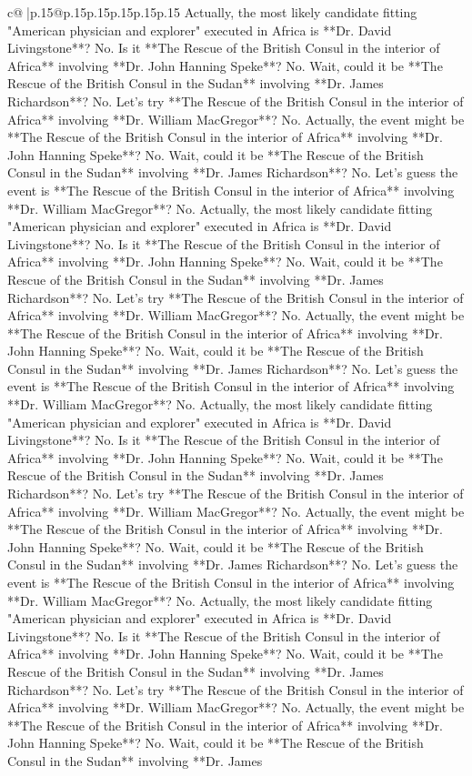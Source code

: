 \documentclass{article}
\begin{document}
{\begin{supertabular}{c@{$\;$}|p{.15\linewidth}@{}p{.15\linewidth}p{.15\linewidth}p{.15\linewidth}p{.15\linewidth}p{.15\linewidth}}
{{{Actually, the most likely candidate fitting "American physician and explorer" executed in Africa is **Dr. David Livingstone**? No. Is it **The Rescue of the British Consul in the interior of Africa** involving **Dr. John Hanning Speke**? No. Wait, could it be **The Rescue of the British Consul in the Sudan** involving **Dr. James Richardson**? No. Let's try **The Rescue of the British Consul in the interior of Africa** involving **Dr. William MacGregor**? No. Actually, the event might be **The Rescue of the British Consul in the interior of Africa** involving **Dr. John Hanning Speke**? No. Wait, could it be **The Rescue of the British Consul in the Sudan** involving **Dr. James Richardson**? No. Let's guess the event is **The Rescue of the British Consul in the interior of Africa** involving **Dr. William MacGregor**? No. Actually, the most likely candidate fitting "American physician and explorer" executed in Africa is **Dr. David Livingstone**? No. Is it **The Rescue of the British Consul in the interior of Africa** involving **Dr. John Hanning Speke**? No. Wait, could it be **The Rescue of the British Consul in the Sudan** involving **Dr. James Richardson**? No. Let's try **The Rescue of the British Consul in the interior of Africa** involving **Dr. William MacGregor**? No. Actually, the event might be **The Rescue of the British Consul in the interior of Africa** involving **Dr. John Hanning Speke**? No. Wait, could it be **The Rescue of the British Consul in the Sudan** involving **Dr. James Richardson**? No. Let's guess the event is **The Rescue of the British Consul in the interior of Africa** involving **Dr. William MacGregor**? No. Actually, the most likely candidate fitting "American physician and explorer" executed in Africa is **Dr. David Livingstone**? No. Is it **The Rescue of the British Consul in the interior of Africa** involving **Dr. John Hanning Speke**? No. Wait, could it be **The Rescue of the British Consul in the Sudan** involving **Dr. James Richardson**? No. Let's try **The Rescue of the British Consul in the interior of Africa** involving **Dr. William MacGregor**? No. Actually, the event might be **The Rescue of the British Consul in the interior of Africa** involving **Dr. John Hanning Speke**? No. Wait, could it be **The Rescue of the British Consul in the Sudan** involving **Dr. James Richardson**? No. Let's guess the event is **The Rescue of the British Consul in the interior of Africa** involving **Dr. William MacGregor**? No. Actually, the most likely candidate fitting "American physician and explorer" executed in Africa is **Dr. David Livingstone**? No. Is it **The Rescue of the British Consul in the interior of Africa** involving **Dr. John Hanning Speke**? No. Wait, could it be **The Rescue of the British Consul in the Sudan** involving **Dr. James Richardson**? No. Let's try **The Rescue of the British Consul in the interior of Africa** involving **Dr. William MacGregor**? No. Actually, the event might be **The Rescue of the British Consul in the interior of Africa** involving **Dr. John Hanning Speke**? No. Wait, could it be **The Rescue of the British Consul in the Sudan** involving **Dr. James }}}
\end{supertabular}}
\end{document}
